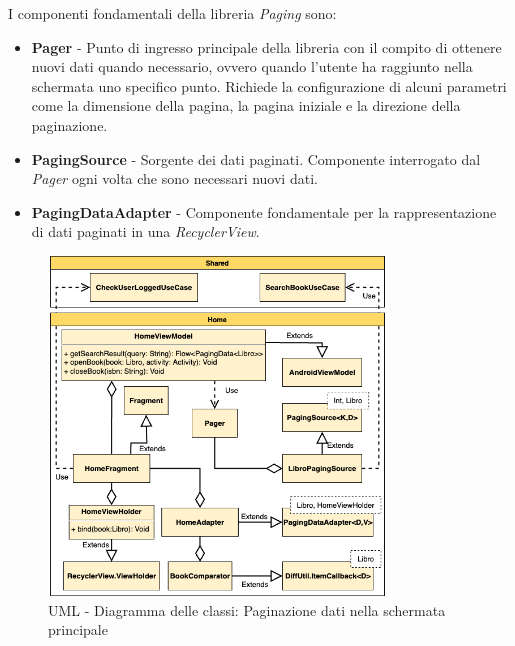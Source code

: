 I componenti fondamentali della libreria \textit{Paging} sono:
\begin{itemize}
    \item \textbf{Pager} - Punto di ingresso principale della libreria con il compito di ottenere nuovi dati quando necessario, ovvero quando l'utente ha raggiunto nella schermata uno specifico punto. Richiede la configurazione di alcuni parametri come la dimensione della pagina, la pagina iniziale e la direzione della paginazione. 
    \item \textbf{PagingSource} - Sorgente dei dati paginati. Componente interrogato dal \textit{Pager} ogni volta che sono necessari nuovi dati.
    \item \textbf{PagingDataAdapter} - Componente fondamentale per la rappresentazione di dati paginati in una \textit{RecyclerView}.
\end{itemize}

\begin{figure}[H]
    \centering
    \includegraphics[width=0.8\textwidth]{img/android-viewmodel.png}
    \caption{UML - Diagramma delle classi: Paginazione dati nella schermata principale}
    \label{android-viewmodel-png}
\end{figure}

